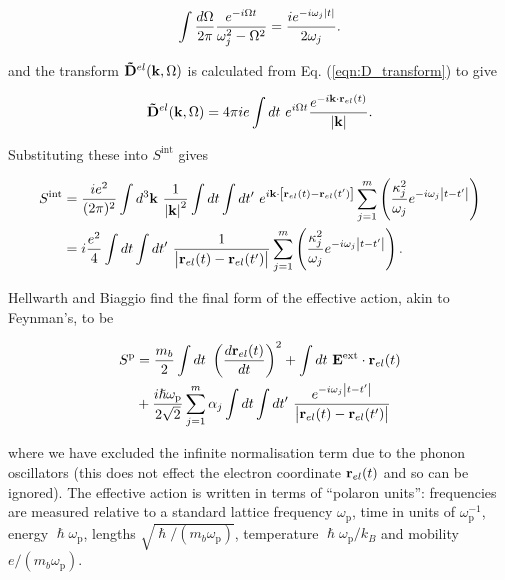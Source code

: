 \begin{equation}
    \int \frac{d\Omega}{2\pi} \frac{e^{-i\Omega t}}{\omega_j^2 - \Omega^2} = \frac{i e^{-i\omega_j \abs{t}}}{2\omega_j}.
\end{equation}

and the transform $\vb{\Tilde{D}}^{el}(\vb{k}, \Omega)$ is calculated from Eq. (\ref{eqn:D_transform}) to give

\begin{equation}
    \vb{\Tilde{D}}^{el}(\vb{k}, \Omega) = 4\pi i e \int dt\ e^{i\Omega t} \frac{e^{-i\vb{k} \cdot \vb{r}_{el}(t)}}{\abs{\vb{k}}}.
\end{equation}

Substituting these into $S^{\text{int}}$ gives

\begin{equation}
    \begin{aligned}
        S^{\text{int}} &= \frac{i e^2}{(2\pi)^2} \int d^3 \vb{k}\ \frac{1}{\abs{\vb{k}}^2} \int dt \int dt'\ e^{i\vb{k} \cdot \left[ \vb{r}_{el}(t) - \vb{r}_{el}(t') \right]} \sum_{j = 1}^m \left( \frac{\kappa_j^2}{\omega_j} e^{-i\omega_j\abs{t-t'}} \right) \\
        &= i \frac{e^2}{4} \int dt \int dt'\ \frac{1}{\abs{\vb{r}_{el}(t) - \vb{r}_{el}(t')}} \sum_{j=1}^m \left( \frac{\kappa_j^2}{\omega_j} e^{-i\omega_j\abs{t-t'}} \right).
    \end{aligned}
\end{equation}

Hellwarth and Biaggio find the final form of the effective action, akin to Feynman's, to be

\begin{equation}\label{eqn:HI_eff_action}
    \begin{aligned}
    S^{\text{p}} &= \frac{m_b}{2} \int dt\ \left( \frac{d\vb{r}_{el}(t)}{dt} \right)^2 + \int dt\ \vb{E}^{\text{ext}} \cdot \vb{r}_{el}(t) \\
    &+ \frac{i\hslash\omega_{\text{p}}}{2\sqrt{2}} \sum_{j = 1}^m \alpha_j \int dt \int dt'\ \frac{e^{-i\omega_j \abs{t-t'}}}{\abs{\vb{r}_{el}(t) - \vb{r}_{el}(t')}} 
    \end{aligned}
\end{equation}

where we have excluded the infinite normalisation term due to the phonon oscillators (this does not effect the electron coordinate $\vb{r}_{el}(t)$ and so can be ignored). The effective action is written in terms of ``polaron units'': frequencies are measured relative to a standard lattice frequency $\omega_{\text{p}}$, time in units of $\omega_{\text{p}}^{-1}$, energy $\hslash \omega_{\text{p}}$, lengths $\sqrt{\hslash/(m_b \omega_{\text{p}})}$, temperature $\hslash\omega_{\text{p}}/k_B$ and mobility $e/(m_b \omega_{\text{p}})$. 

